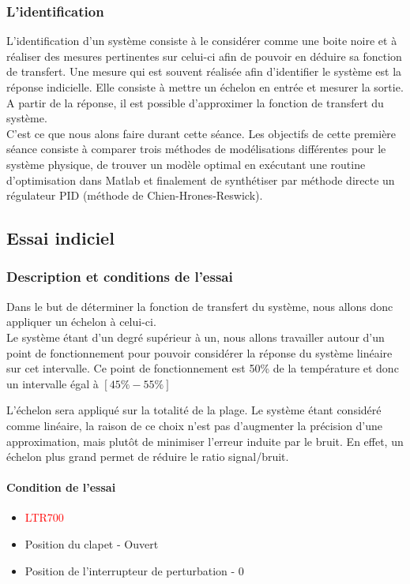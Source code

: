 \subsubsection{L'identification}
L'identification d'un système consiste à le considérer comme une boite noire et à réaliser
des mesures pertinentes sur celui-ci afin de pouvoir en déduire sa fonction de transfert.
Une mesure qui est souvent réalisée afin d'identifier le système est la réponse indicielle.
Elle consiste à mettre un échelon en entrée et mesurer la sortie. A partir de la réponse,
il est possible d'approximer la fonction de transfert du système.\\

C'est ce que nous alons faire durant cette séance. Les objectifs de cette 
première séance consiste à comparer trois méthodes de modélisations 
différentes pour le système physique, de trouver un modèle optimal en exécutant une routine
d'optimisation dans Matlab et finalement de synthétiser par méthode directe un 
régulateur PID (méthode de Chien-Hrones-Reswick).


\subsection{Essai indiciel}
\subsubsection{Description et conditions de l'essai}
Dans le but de déterminer la fonction de transfert du système, nous allons donc appliquer un échelon à celui-ci.\\

Le système étant d'un degré supérieur à un, nous allons travailler autour d'un point de fonctionnement pour pouvoir considérer la réponse du système linéaire sur cet intervalle. Ce point de fonctionnement est 50\% de la température et donc un intervalle égal à $[45\% - 55\%]$

L'échelon sera appliqué sur la totalité de la plage. Le système étant considéré comme linéaire, la raison de ce choix n'est pas d'augmenter la précision d'une approximation, mais plutôt de minimiser l'erreur induite par le bruit. En effet, un échelon plus grand permet de réduire le ratio signal/bruit.\\

\paragraph{Condition de l'essai}
\begin{itemize}
\item \textcolor{red}{LTR700}
\item Position du clapet - Ouvert
\item Position de l'interrupteur de perturbation - 0
\end{itemize}

